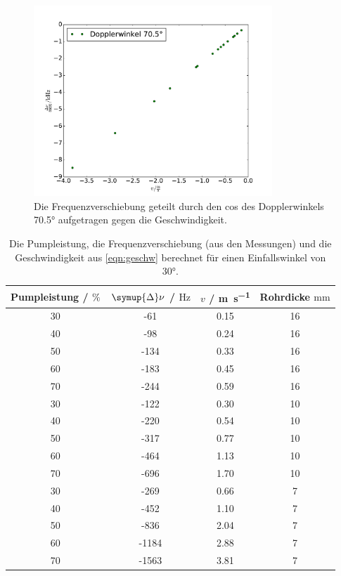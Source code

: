 \documentclass[
  bibliography=totoc,     %
  captions=tableheading,  %
  titlepage=firstiscover, %
]{scrartcl}
\begin{document}
      \begin{figure}
      \centering
        \includegraphics[width=0.8\textwidth]{a30.pdf}
        \caption{Die Frequenzverschiebung geteilt durch den cos des
        Dopplerwinkels 70.5° aufgetragen gegen die Geschwindigkeit.}
        \label{fig:2}
    \end{figure}
    \begin{table}
      \centering
      \begin{tabular}{c c c c}
        \toprule
        {Pumpleistung / $\si{\percent}$} & {$\symup{\Delta} \nu$ / $\si{\hertz}$} & {$v$ /
        \si{\meter\per\second}} & {Rohrdicke $\si{\milli\meter}$} \\
        \midrule
        30 & -61 & 0.15 & 16\\
        40 & -98 & 0.24 & 16\\
        50 & -134 & 0.33 & 16\\
        60 & -183 & 0.45 & 16\\
        70 & -244 & 0.59 & 16\\
        30 & -122 & 0.30 & 10\\
        40 & -220 & 0.54 & 10\\
        50 & -317 & 0.77 & 10\\
        60 & -464 & 1.13 & 10\\
        70 & -696 & 1.70 & 10\\
        30 & -269 & 0.66 & 7\\
        40 & -452 & 1.10 & 7\\
        50 & -836 & 2.04 & 7\\
        60 & -1184 & 2.88 & 7\\
        70 & -1563 & 3.81 & 7\\
      \bottomrule
      \end{tabular}
      \caption{Die Pumpleistung, die Frequenzverschiebung (aus den Messungen)
      und die Geschwindigkeit aus \eqref{eqn:geschw} berechnet für einen
      Einfallswinkel von 30°.}
      \label{tab:3}
    \end{table}
\end{document}
